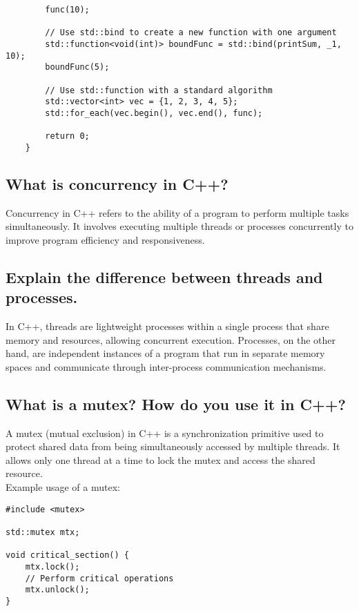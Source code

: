 \begin{itemize}
\begin{tcolorbox}[title=\texttt{std::function}]
\begin{verbatim}
        func(10);
    
        // Use std::bind to create a new function with one argument
        std::function<void(int)> boundFunc = std::bind(printSum, _1, 10);
        boundFunc(5);
    
        // Use std::function with a standard algorithm
        std::vector<int> vec = {1, 2, 3, 4, 5};
        std::for_each(vec.begin(), vec.end(), func);
    
        return 0;
    }
    \end{verbatim}
    \end{tcolorbox}
\end{itemize}

\subsection{What is concurrency in C++?}
Concurrency in C++ refers to the ability of a program to perform multiple tasks simultaneously. It involves executing multiple threads or processes concurrently to improve program efficiency and responsiveness.


\subsection{Explain the difference between threads and processes.}
In C++, threads are lightweight processes within a single process that share memory and resources, allowing concurrent execution. Processes, on the other hand, are independent instances of a program that run in separate memory spaces and communicate through inter-process communication mechanisms.


\subsection{What is a mutex? How do you use it in C++?}
A mutex (mutual exclusion) in C++ is a synchronization primitive used to protect shared data from being simultaneously accessed by multiple threads. It allows only one thread at a time to lock the mutex and access the shared resource. \\
Example usage of a mutex:
\begin{tcolorbox}[title=Mutex]
\begin{verbatim}
#include <mutex>

std::mutex mtx;

void critical_section() {
    mtx.lock();
    // Perform critical operations
    mtx.unlock();
}
\end{verbatim}
\end{tcolorbox}

